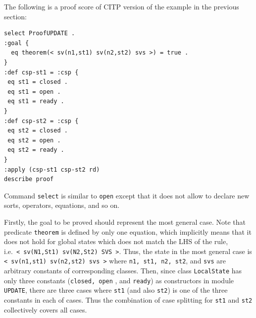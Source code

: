 \documentclass[12pt]{report}
\newcommand{\stt}[1]{{\small{\tt {#1}}}}
\begin{document}
The following is a proof score of CITP version of the example in the previous section:
\begin{verbatim}
select ProofUPDATE .
:goal {
  eq theorem(< sv(n1,st1) sv(n2,st2) svs >) = true .
}
:def csp-st1 = :csp {
 eq st1 = closed .
 eq st1 = open .
 eq st1 = ready .
}
:def csp-st2 = :csp {
 eq st2 = closed .
 eq st2 = open .
 eq st2 = ready .
}
:apply (csp-st1 csp-st2 rd)
describe proof
\end{verbatim}
Command {\tt select} is similar to {\tt open} except that it does not
allow to declare new sorts, operators, equations, and so on. 

Firstly, the goal to be proved should represent the most general case.
Note that predicate {\tt theorem} is defined by only one equation,
which implicitly means that it does not hold for global states which
does not match the LHS of the rule,
i.e.\ \stt{<~sv(N1,St1)~sv(N2,St2)~SVS~>}. Thus, the state in the most
general case is \stt{<~sv(n1,st1)~sv(n2,st2)~svs~>} where \stt{n1,
  st1, n2, st2}, and {\tt svs} are arbitrary constants of
corresponding classes.  Then, since class {\tt LocalState} has only
three constants ({\tt closed, open} , and {\tt ready}) as constructors
in module {\tt UPDATE}, there are three cases where {\tt st1} (and
also {\tt st2}) is one of the three constants in each of cases. Thus
the combination of case splitting for {\tt st1} and {\tt st2}
collectively covers all cases.
\end{document}
